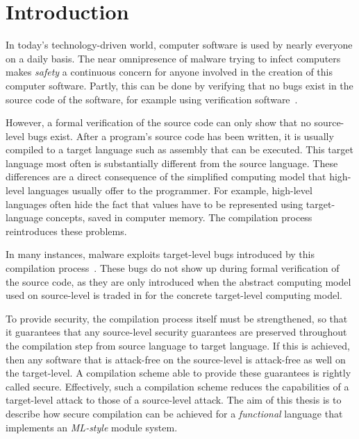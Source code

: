 \chapter{Introduction}

In today's technology-driven world, computer software is used by nearly everyone on a daily basis.
The near omnipresence of malware trying to infect computers makes \emph{safety} a continuous concern for anyone involved in the creation of this computer software.
Partly, this can be done by verifying that no bugs exist in the source code of the software, for example using verification software~\cite{Verifast:paper,Verifast:tutorial}.

However, a formal verification of the source code can only show that no source-level bugs exist.
After a program's source code has been written, it is usually compiled to a target language such as assembly that can be executed.
This target language most often is substantially different from the source language.
These differences are a direct consequence of the simplified computing model that high-level languages usually offer to the programmer.
For example, high-level languages often hide the fact that values have to be represented using target-language concepts, saved in computer memory.
The compilation process reintroduces these problems.

In many instances, malware exploits target-level bugs introduced by this compilation process~\cite{OVSPaper,Younan:2012:RCC:2187671.2187679}.
These bugs do not show up during formal verification of the source code, as they are only introduced when the abstract computing model used on source-level is traded in for the concrete target-level computing model.

To provide security, the compilation process itself must be strengthened, so that it guarantees that any source-level security guarantees are preserved throughout the compilation step from source language to target language.
If this is achieved, then any software that is attack-free on the source-level is attack-free as well on the target-level.
A compilation scheme able to provide these guarantees is rightly called secure.
Effectively, such a compilation scheme reduces the capabilities of a target-level attack to those of a source-level attack.
The aim of this thesis is to describe how secure compilation can be achieved for a \emph{functional} language that implements an \emph{ML-style} module system.


